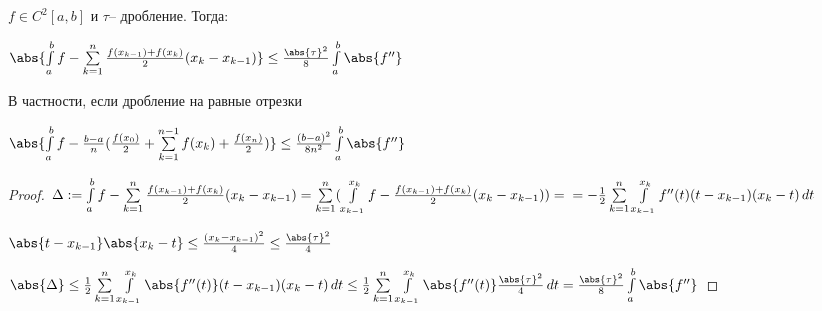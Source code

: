 \begin{theorem}\slashns
	
	$f \in C^2[a,b]$ и $\tau$-- дробление. Тогда:
	
	$\abs{\int\limits_a^b f - \sum\limits_{k=1}^{n} \frac{f(x_{k-1}) + f(x_k)}{2} (x_k - x_{k-1})} \le \frac{\abs{\tau}^2}{8} \int\limits_a^b \abs{f''}$
	
	В частности, если дробление на равные отрезки
	
	$\abs{\int\limits_a^b f - \frac{b-a}{n}(\frac{f(x_0)}{2} + \sum\limits_{k=1}^{n-1}f(x_k) + \frac{f(x_n)}{2})} \le \frac{(b-a)^2}{8n^2} \int\limits_a^b \abs{f''}$
\end{theorem}


\begin{proof}\slashns
	
	$\Delta:= \int\limits_a^b f - \sum\limits_{k=1}^{n} \frac{f(x_{k-1}) + f(x_k)}{2}(x_k - x_{k-1}) = \sum\limits_{k=1}^{n}(\int\limits_{x_{k-1}}^{x_k} f - \frac{f(x_{k-1}) + f(x_k)}{2} (x_k - x_{k-1})) =\\= -\frac12 \sum\limits_{k=1}^n \int\limits_{x_{k-1}}^{x_k} f''(t)(t-x_{k-1})(x_k - t) \, dt $
	
	$\abs{t-x_{k-1}}\abs{x_{k}-t}\le \frac{(x_k - x_{k - 1})^2}{4}\le \frac{\abs{\tau}^2}{4}$
	
	$\abs{\Delta} \le \frac12 \sum\limits_{k=1}^n \int\limits_{x_{k-1}}^{x_k} \abs{f''(t)}(t - x_{k-1})(x_k - t) \, dt \le \frac12 \sum\limits_{k=1}^n \int\limits_{x_{k-1}}^{x_k} \abs{f''(t)}\frac{\abs{\tau}^2}{4} \, dt = \frac{\abs{\tau}^2}{8} \int\limits_a^b \abs{f''}$
		
\end{proof}
